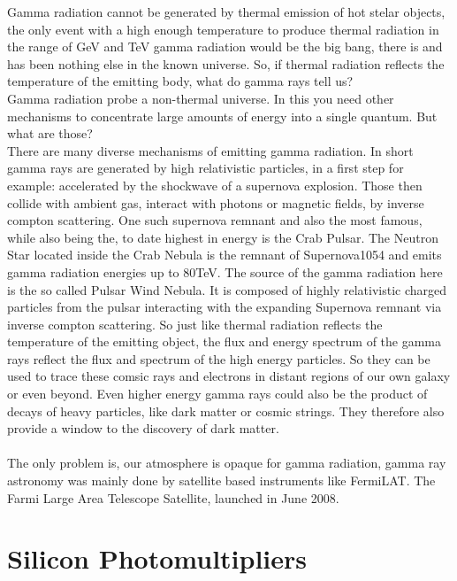 \documentclass[12pt,article,type=msc,colorback,accentcolor=tud9c]{tudthesis}
\begin{document}
Gamma radiation cannot be generated by thermal emission of hot stelar objects, the only event  with a high enough temperature to produce thermal radiation in the range of GeV and TeV gamma radiation would be the big bang, there is and has been nothing else in the known universe. So, if thermal radiation reflects the temperature of the emitting body, what do gamma rays tell us?\\
Gamma radiation probe a non-thermal universe. In this you need other mechanisms to concentrate large amounts of energy into a single quantum. But what are those?\\
There are many diverse mechanisms of emitting gamma radiation. In short gamma rays are generated by high relativistic particles, in a first step for example: accelerated by the shockwave of a supernova explosion. Those then collide with ambient gas, interact with photons or magnetic fields, by inverse compton scattering.
One such supernova remnant and also the most famous, while also being the, to date highest in energy is the Crab Pulsar. The Neutron Star located inside the Crab Nebula is the remnant of Supernova1054 and emits gamma radiation energies up to 80TeV. The source of the gamma radiation here is the so called Pulsar Wind Nebula. It is composed of highly relativistic charged particles from the pulsar interacting with the expanding Supernova remnant via inverse compton scattering.
So just like thermal radiation reflects the temperature of the emitting object, the flux and energy spectrum of the gamma rays reflect the flux and spectrum of the high energy particles. So they can be used to trace these comsic rays and electrons in distant regions of our own galaxy or even beyond.
Even higher energy gamma rays could also be the product of decays of heavy particles, like dark matter or cosmic strings.  They therefore also provide a window to the discovery of dark matter.\\ \\
The only problem is, our atmosphere is opaque for gamma radiation, gamma ray astronomy was mainly done by satellite based instruments like FermiLAT. The Farmi Large Area Telescope Satellite, launched in June 2008.


\newpage
\section{Silicon Photomultipliers}
\label{sec:SiPM}
\end{document}
